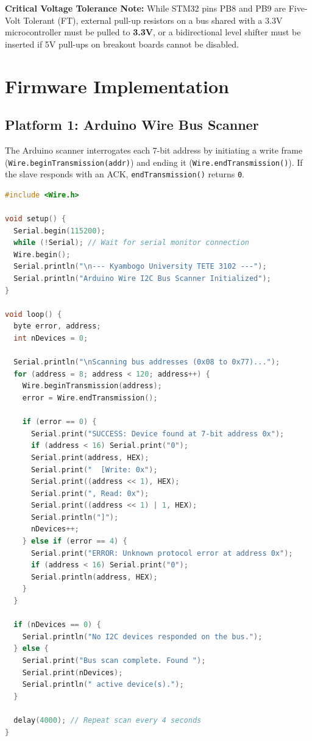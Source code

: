 \documentclass[11pt,a4paper]{article}
\begin{document}
\begin{troublebox}
\textbf{Critical Voltage Tolerance Note:} While STM32 pins PB8 and PB9 are Five-Volt Tolerant (FT), external pull-up resistors on a bus shared with a 3.3V microcontroller must be pulled to \textbf{3.3V}, or a bidirectional level shifter must be inserted if 5V pull-ups on breakout boards cannot be disabled.
\end{troublebox}

\section{Firmware Implementation}

\subsection{Platform 1: Arduino Wire Bus Scanner}
The Arduino scanner interrogates each 7-bit address by initiating a write frame (\texttt{Wire.beginTransmission(addr)}) and ending it (\texttt{Wire.endTransmission()}). If the slave responds with an ACK, \texttt{endTransmission()} returns \texttt{0}.

\begin{lstlisting}[language=C++, caption={Arduino Uno I2C Bus Scanner Implementation}]
#include <Wire.h>

void setup() {
  Serial.begin(115200);
  while (!Serial); // Wait for serial monitor connection
  Wire.begin();
  Serial.println("\n--- Kyambogo University TETE 3102 ---");
  Serial.println("Arduino Wire I2C Bus Scanner Initialized");
}

void loop() {
  byte error, address;
  int nDevices = 0;

  Serial.println("\nScanning bus addresses (0x08 to 0x77)...");
  for (address = 8; address < 120; address++) {
    Wire.beginTransmission(address);
    error = Wire.endTransmission();

    if (error == 0) {
      Serial.print("SUCCESS: Device found at 7-bit address 0x");
      if (address < 16) Serial.print("0");
      Serial.print(address, HEX);
      Serial.print("  [Write: 0x");
      Serial.print((address << 1), HEX);
      Serial.print(", Read: 0x");
      Serial.print((address << 1) | 1, HEX);
      Serial.println("]");
      nDevices++;
    } else if (error == 4) {
      Serial.print("ERROR: Unknown protocol error at address 0x");
      if (address < 16) Serial.print("0");
      Serial.println(address, HEX);
    }
  }

  if (nDevices == 0) {
    Serial.println("No I2C devices responded on the bus.");
  } else {
    Serial.print("Bus scan complete. Found ");
    Serial.print(nDevices);
    Serial.println(" active device(s).");
  }

  delay(4000); // Repeat scan every 4 seconds
}
\end{lstlisting}
\end{document}

